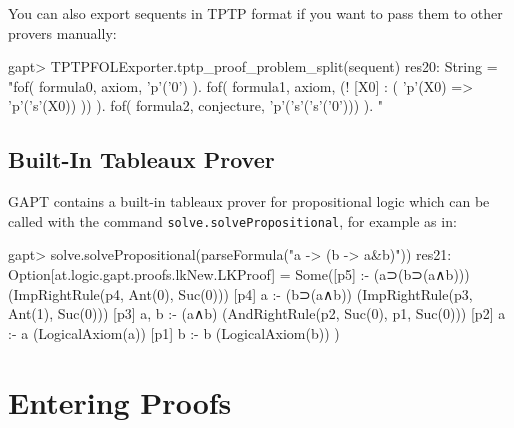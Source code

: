 \documentclass[a4paper,11pt]{article}
\begin{document}
You can also export sequents in TPTP format if you want to pass them to other
provers manually:
\begin{clilisting}
gapt> TPTPFOLExporter.tptp_proof_problem_split(sequent)
res20: String =
"fof( formula0, axiom, 'p'('0') ).
fof( formula1, axiom, (! [X0] : ( 'p'(X0) => 'p'('s'(X0)) )) ).
fof( formula2, conjecture, 'p'('s'('s'('0'))) ).
"

\end{clilisting}

\subsection{Built-In Tableaux Prover}

GAPT contains a  built-in tableaux prover for propositional logic
which can be called with the command \texttt{solve.solvePropositional}, for example as in:
\begin{clilisting}
gapt> solve.solvePropositional(parseFormula("a -> (b -> a&b)"))
res21: Option[at.logic.gapt.proofs.lkNew.LKProof] =
Some([p5]  :- (a⊃(b⊃(a∧b)))    (ImpRightRule(p4, Ant(0), Suc(0)))
[p4] a :- (b⊃(a∧b))    (ImpRightRule(p3, Ant(1), Suc(0)))
[p3] a, b :- (a∧b)    (AndRightRule(p2, Suc(0), p1, Suc(0)))
[p2] a :- a    (LogicalAxiom(a))
[p1] b :- b    (LogicalAxiom(b))
)

\end{clilisting}

\section{Entering Proofs}\label{sec:entering_proofs}
\end{document}
